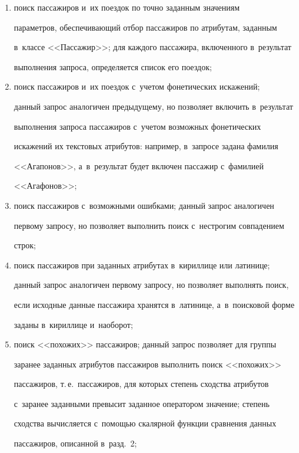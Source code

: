 \begin{enumerate}[(1)]


\item поиск пассажиров и~их поездок по точно заданным значениям 


параметров, обеспечивающий отбор пассажиров по атрибутам, заданным 


в~классе <<Пассажир>>; для каждого пассажира, включенного в~результат 


выполнения запроса, определяется список его поездок;


\item поиск пассажиров и~их поездок с~учетом фонетических искажений; 


данный запрос аналогичен предыдущему, но позволяет включить в~результат 


выполнения запроса пассажиров с~учетом возможных фонетических 


искажений их текстовых атрибутов: например, в~запросе задана фамилия 


<<Агапонов>>, а~в~результат будет включен пассажир с~фамилией 


<<Агафонов>>;


\item поиск пассажиров с~возможными ошибками; данный запрос аналогичен 


первому запросу, но позволяет выполнить поиск с~нестрогим совпадением 


строк;


\item поиск пассажиров при заданных атрибутах в~кириллице или латинице; 


данный запрос аналогичен первому запросу, но позволяет выполнять поиск, 


если исходные данные пассажира хранятся в~латинице, а~в~поисковой форме 


заданы в~кириллице и~наоборот;


\item поиск <<похожих>> пассажиров; данный запрос позволяет для группы 


заранее заданных атрибутов пассажиров выполнить поиск <<похожих>> 


пассажиров, т.\,е.\ пассажиров, для которых степень сходства атрибутов 


с~заранее заданными превысит заданное оператором значение; степень 


сходства вычисляется с~помощью скалярной функции сравнения данных 


пассажиров, описанной в~разд.~2;



\end{enumerate}
